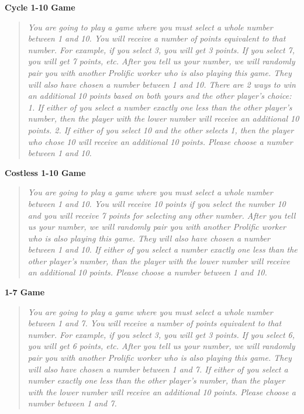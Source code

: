\noindent\textbf{Cycle 1-10 Game}
\begin{quote}
\emph{You are going to play a game where you must select a whole number between 1 and 10.
You will receive a number of points equivalent to that number. 
For example, if you select 3, you will get 3 points. 
If you select 7, you will get 7 points, etc.
After you tell us your number, we will randomly pair you with another Prolific worker who is also playing this game. 
They will also have chosen a number between 1 and 10.
There are 2 ways to win an additional 10 points based on both yours and the other player's choice:
1. If either of you select a number exactly one less than the other player's number, then the player with the lower number will receive an additional 10 points.
2. If either of you select 10 and the other selects 1, then the player who chose 10 will receive an additional 10 points.
Please choose a number between 1 and 10.}
\end{quote}

\noindent\textbf{Costless 1-10 Game}
\begin{quote}
\emph{You are going to play a game where you must select a whole number between 1 and 10.
You will receive 10 points if you select the number 10 and you will receive 7 points for selecting any other number. 
After you tell us your number, we will randomly pair you with another Prolific worker who is also playing this game. 
They will also have chosen a number between 1 and 10.
If either of you select a number exactly one less than the other player's number, than the player with the lower number will receive an additional 10 points.
Please choose a number between 1 and 10.}
\end{quote}

\noindent\textbf{1-7 Game}
\begin{quote}
\emph{You are going to play a game where you must select a whole number between 1 and 7.
You will receive a number of points equivalent to that number. For example, if you select 3, you will get 3 points. 
If you select 6, you will get 6 points, etc.
After you tell us your number, we will randomly pair you with another Prolific worker who is also playing this game. 
They will also have chosen a number between 1 and 7.
If either of you select a number exactly one less than the other player's number, than the player with the lower number will receive an additional 10 points.
Please choose a number between 1 and 7.}
\end{quote}

